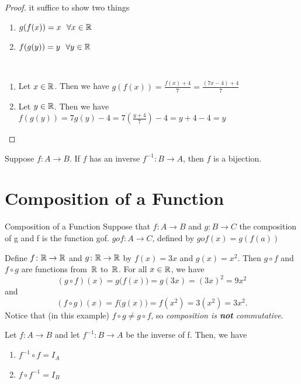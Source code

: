 \documentclass[../MATH-2000-Notes.tex]{subfiles}
\begin{document}
\begin{proof}
    it suffice to show two things
    \begin{enumerate}
        \item \(g(f(x)) = x\ \ \forall x \in \mathbb{R}\)
        \item \(f(g(y)) = y\ \ \forall y \in \mathbb{R}\)
    \end{enumerate}
    ~\\
    \begin{enumerate}
        \item Let \(x \in \mathbb{R} \). Then we have \(g(f(x)) = \frac{f(x) + 4}{7} = \frac{(7x - 4) + 4 }{7}\)
        \item Let \(y \in \mathbb{R} \). Then we have \(f(g(y)) = 7g(y) - 4 = 7\left( \frac{y + 4}{7} \right) - 4 = y + 4 - 4 = y\)
    \end{enumerate}
\end{proof}
\begin{Theorem}
    {}\label{Inverse->Bijection}
    Suppose $f\colon A \to B$. If $f$ has an inverse $f^{-1} \colon B \to A$, then $f$ is a bijection.
\end{Theorem}



\section{Composition of a Function}
\begin{Definition}
    {Composition of a Function}
    Suppose that \(f: A\rightarrow B\) and \(g: B \rightarrow C\) the composition of g and f is the function gof. \(gof: A \rightarrow C\), defined by \(gof(x) = g(f(a))\)
\end{Definition}
Define $f \colon \mathbb{R} \to \mathbb{R}$ and $g \colon \mathbb{R} \to \mathbb{R}$ by
$f(x) = 3x$ and $g(x) = x^2$. Then $g \circ f$ and $f \circ g$ are functions from~$\mathbb{R}$ to~$\mathbb{R}$. For all $x \in \mathbb{R}$, we have
$$(g \circ f)(x) = g \bigl( f(x) \bigr) = g(3x) =(3x)^2 =  9x^2 $$
and
$$(f \circ g)(x) = f \bigl( g(x) \bigr) = f(x^2) = 3(x^2) = 3x^2 .$$
Notice that (in this example) $f \circ g \neq g \circ f$, so \emph{composition is \textbf{not} commutative}.

\begin{Proposition}
    {}
    Let \(f: A \rightarrow B\) and let \(f^{-1}: B \rightarrow A\) be the inverse of f. Then, we have \begin{enumerate}
        \item \(f^{-1} \circ f = I_A\)
        \item \(f \circ f^{-1} = I_B\)
    \end{enumerate}
\end{Proposition}
\end{document}
